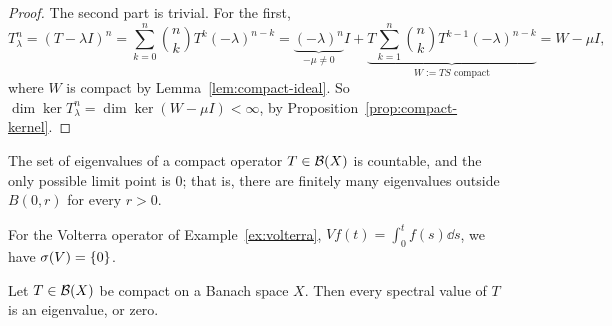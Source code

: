 \begin{proof}
The second part is trivial. For the first,
\[
  T_\lambda^n = (T - \lambda I)^n
  = \sum_{k=0}^{n} \binom{n}{k} T^k (-\lambda)^{n-k}
  = \underbrace{(-\lambda)^n}_{-\mu \ne 0} I
    + \underbrace{T \sum_{k=1}^{n} \binom{n}{k} T^{k-1}
      (-\lambda)^{n-k}}_{W := TS \text{ compact}}
  = W - \mu I ,
\]
where $W$ is compact by Lemma~\ref{lem:compact-ideal}. So
$\dim \ker T_\lambda^n = \dim \ker(W - \mu I) < \infty$, by
Proposition~\ref{prop:compact-kernel}.
\end{proof}

\begin{theorem}\label{thm:compact-eigenvalues}
The set of eigenvalues of a compact operator $T \in \mathcal{B}(X)$ is countable,
and the only possible limit point is $0$; that is, there are finitely many
eigenvalues outside $B(0, r)$ for every $r > 0$.
\end{theorem}

\begin{example}
For the Volterra operator of Example~\ref{ex:volterra},
$Vf(t) = \int_0^t f(s) \dd s$, we have $\sigma(V) = \{0\}$.
\end{example}

\begin{theorem}\label{thm:compact-spectrum}
Let $T \in \mathcal{B}(X)$ be compact on a Banach space $X$. Then every spectral
value of $T$ is an eigenvalue, or zero.
\end{theorem}
